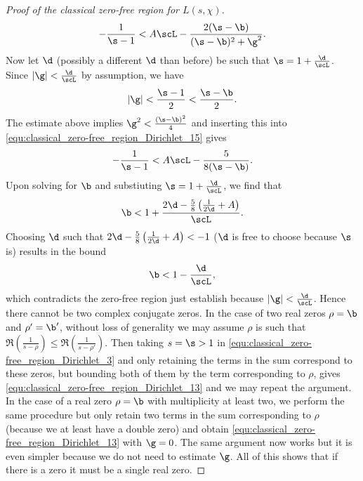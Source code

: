 \begin{proof}[Proof of the classical zero-free region for $L(s,\chi)$]
        \begin{equation}\label{equ:classical_zero-free_region_Dirichlet_15}
          -\frac{1}{\s-1} < A\scL-\frac{2(\s-\b)}{(\s-\b)^{2}+\g^{2}}.
        \end{equation}
        Now let $\d$ (possibly a different $\d$ than before) be such that $\s = 1+\frac{\d}{\scL}$. Since $|\g| < \frac{\d}{\scL}$ by assumption, we have
        \[
          |\g| < \frac{\s-1}{2} < \frac{\s-\b}{2}.
        \]
        The estimate above implies $\g^{2} < \frac{(\s-\b)^{2}}{4}$ and inserting this into \cref{equ:classical_zero-free_region_Dirichlet_15} gives
        \[
          -\frac{1}{\s-1} < A\scL-\frac{5}{8(\s-\b)}.
        \]
        Upon solving for $\b$ and substiuting $\s = 1+\frac{\d}{\scL}$, we find that
        \[
          \b < 1+\frac{2\d-\frac{5}{8}\left(\frac{1}{2\d}+A\right)}{\scL}.
        \]
        Choosing $\d$ such that $2\d-\frac{5}{8}\left(\frac{1}{2\d}+A\right) < -1$ ($\d$ is free to choose because $\s$ is) results in the bound
        \[
          \b < 1-\frac{\d}{\scL},
        \]
        which contradicts the zero-free region just establish because $|\g| < \frac{\d}{\scL}$. Hence there cannot be two complex conjugate zeros. In the case of two real zeros $\rho = \b$ and $\rho' = \b'$, without loss of generality we may assume $\rho$ is such that $\Re\left(\frac{1}{s-\rho}\right) \le \Re\left(\frac{1}{s-\rho'}\right)$. Then taking $s = \s > 1$ in \cref{equ:classical_zero-free_region_Dirichlet_3} and only retaining the terms in the sum correspond to these zeros, but bounding both of them by the term corresponding to $\rho$, gives \cref{equ:classical_zero-free_region_Dirichlet_13} and we may repeat the argument. In the case of a real zero $\rho = \b$ with multiplicity at least two, we perform the same procedure but only retain two terms in the sum corresponding to $\rho$ (because we at least have a double zero) and obtain \cref{equ:classical_zero-free_region_Dirichlet_13} with $\g = 0$. The same argument now works but it is even simpler because we do not need to estimate $\g$. All of this shows that if there is a zero it must be a single real zero.
      \end{proof}

